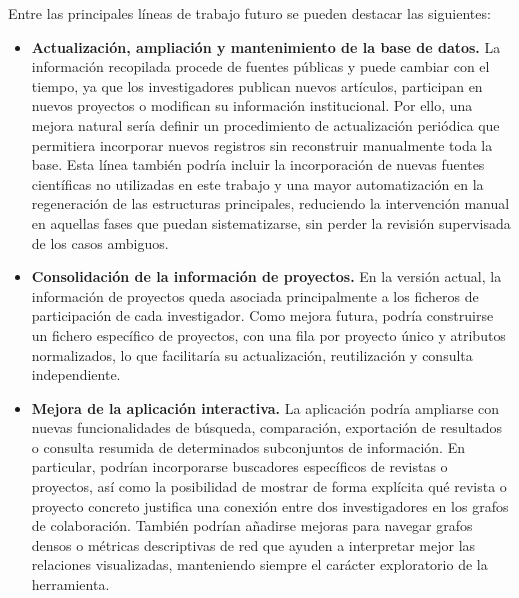 \documentclass[11pt,spanish,listoffigures,listoftables]{tfgetsinf}
\begin{document}
Entre las principales líneas de trabajo futuro se pueden destacar las siguientes:

\begin{itemize}
    \item \textbf{Actualización, ampliación y mantenimiento de la base de datos.} La información recopilada procede de fuentes públicas y puede cambiar con el tiempo, ya que los investigadores publican nuevos artículos, participan en nuevos proyectos o modifican su información institucional. Por ello, una mejora natural sería definir un procedimiento de actualización periódica que permitiera incorporar nuevos registros sin reconstruir manualmente toda la base. Esta línea también podría incluir la incorporación de nuevas fuentes científicas no utilizadas en este trabajo y una mayor automatización en la regeneración de las estructuras principales, reduciendo la intervención manual en aquellas fases que puedan sistematizarse, sin perder la revisión supervisada de los casos ambiguos.

    \item \textbf{Consolidación de la información de proyectos.} En la versión actual, la información de proyectos queda asociada principalmente a los ficheros de participación de cada investigador. Como mejora futura, podría construirse un fichero específico de proyectos, con una fila por proyecto único y atributos normalizados, lo que facilitaría su actualización, reutilización y consulta independiente.

   \item \textbf{Mejora de la aplicación interactiva.} La aplicación podría ampliarse con nuevas funcionalidades de búsqueda, comparación, exportación de resultados o consulta resumida de determinados subconjuntos de información. En particular, podrían incorporarse buscadores específicos de revistas o proyectos, así como la posibilidad de mostrar de forma explícita qué revista o proyecto concreto justifica una conexión entre dos investigadores en los grafos de colaboración. También podrían añadirse mejoras para navegar grafos densos o métricas descriptivas de red que ayuden a interpretar mejor las relaciones visualizadas, manteniendo siempre el carácter exploratorio de la herramienta.


\end{itemize}
\end{document}

